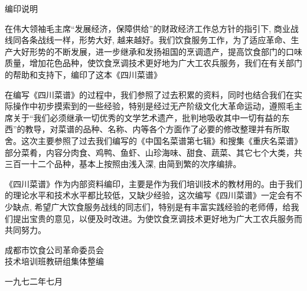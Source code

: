 \begin{center}
\Large
编印说明
\end{center}

在伟大领袖毛主席“发展经济，保障供给”的财政经济工作总方针的指引下, 商业战线同各条战线一样，形势大好, 越来越好。我们饮食服务工作，为了适应革命、生产大好形势的不断发展，进一步继承和发扬祖国的烹调遗产，提高饮食部门的口味质量，增加花色品种，使饮食烹调技术更好地为广大工农兵服务，我们在有关部门的帮助和支持下，编印了这本《四川菜谱》

在编写《四川菜谱》的过程中，我们参照了过去积累的资料，同时也结合我们在实际操作中初步摸索到的一些经验，特别是经过无产阶级文化大革命运动，遵照毛主席关于“我们必须继承一切优秀的文学艺术遗产，批判地吸收其中一切有益的东西”的教导，对菜谱的品种、名称、内等各个方面作了必要的修改整理并有所取舍。这次主要参照了过去我们编写的《中国名菜谱第七辑》和搜集《重庆名菜谱》部分菜肴，内容分肉食、鸡鸭、鱼虾、山珍海味、甜食、蔬菜、其它七个大类，共三百一十二个品种，基本上按照由浅入深, 由简到繁的次序编排。

《四川菜谱》作为内部资料编印，主要是作为我们培训技术的教材用的。由于我们的理论水平和技术水平都比较低，又缺少经验，这次编写《四川菜谱》一定会有不少缺点, 希望广大饮食服务战线的同志们，特别是有丰富实践经验的老师傅，给我们提出宝贵的意见，以便及时改进。为使饮食烹调技术更好地为广大工农兵服务而共同努力。

\begin{flushright}
成都市饮食公司革命委员会\\
技术培训班教研组集体整编

一九七二年七月
\end{flushright}
